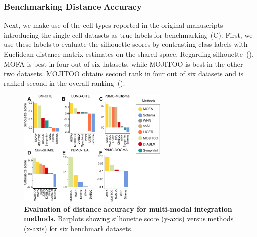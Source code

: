 \subsubsection{Benchmarking Distance Accuracy}
Next, we make use of the cell types reported in the original manuscripts introducing the single-cell datasets as true labels for benchmarking~(C). First, we use these labels to evaluate the silhouette scores by contrasting class labels with Euclidean distance matrix estimates on the shared space. Regarding silhouette~(), MOFA is best in four out of six datasets, while MOJITOO is best in the other two datasets. MOJITOO obtains second rank in four out of six datasets and is ranked second in the overall ranking~(). 
\begin{figure}[!ht]
	\centering
	\includegraphics[width=0.65\textwidth]{silouette/fig}
	\vspace{0.1cm}
	\caption[Evaluation of distance accuracy for multi-modal integration methods.]{
        \textbf{Evaluation of distance accuracy for multi-modal integration methods.} Barplots showing silhouette score (y-axis) versus methods (x-axis) for six benchmark datasets. }
	\label{fig:silouette}
\end{figure}


